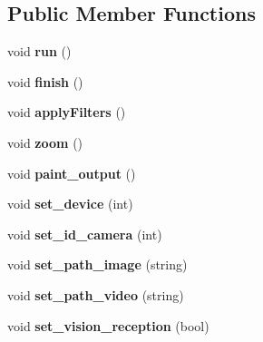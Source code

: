 \subsection*{Public Member Functions}
\begin{DoxyCompactItemize}
\item 
\hypertarget{classcalibration_a4b435b278f024e919b733627884ba0d2}{void {\bfseries run} ()}\label{classcalibration_a4b435b278f024e919b733627884ba0d2}

\item 
\hypertarget{classcalibration_a01c20860fb99a2370c191b0228e82af4}{void {\bfseries finish} ()}\label{classcalibration_a01c20860fb99a2370c191b0228e82af4}

\item 
\hypertarget{classcalibration_a17edbce9454069eaa50cc84aa1cb34fd}{void {\bfseries apply\-Filters} ()}\label{classcalibration_a17edbce9454069eaa50cc84aa1cb34fd}

\item 
\hypertarget{classcalibration_af2cc271619bd9d5c0e72ebbbf1b83f39}{void {\bfseries zoom} ()}\label{classcalibration_af2cc271619bd9d5c0e72ebbbf1b83f39}

\item 
\hypertarget{classcalibration_a9d29a622f2412fcf5cb654444d1bd43e}{void {\bfseries paint\-\_\-output} ()}\label{classcalibration_a9d29a622f2412fcf5cb654444d1bd43e}

\item 
\hypertarget{classcalibration_adba399584f906544ce09309e5539bb84}{void {\bfseries set\-\_\-device} (int)}\label{classcalibration_adba399584f906544ce09309e5539bb84}

\item 
\hypertarget{classcalibration_aee45977e438474eb1111964a827a8ff9}{void {\bfseries set\-\_\-id\-\_\-camera} (int)}\label{classcalibration_aee45977e438474eb1111964a827a8ff9}

\item 
\hypertarget{classcalibration_a2eacc8d2c839f71182d3ec0440056ee7}{void {\bfseries set\-\_\-path\-\_\-image} (string)}\label{classcalibration_a2eacc8d2c839f71182d3ec0440056ee7}

\item 
\hypertarget{classcalibration_ac4b64b95163be3bfdfb13c2d23592756}{void {\bfseries set\-\_\-path\-\_\-video} (string)}\label{classcalibration_ac4b64b95163be3bfdfb13c2d23592756}

\item 
\hypertarget{classcalibration_a5a1d0ee04511fc9a61767d3bb3f4e357}{void {\bfseries set\-\_\-vision\-\_\-reception} (bool)}\label{classcalibration_a5a1d0ee04511fc9a61767d3bb3f4e357}


\end{DoxyCompactItemize}
